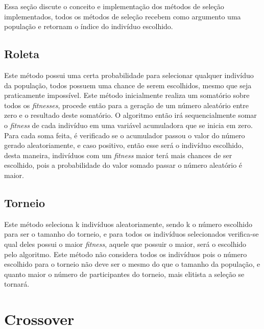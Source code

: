 \documentclass[12pt]{article}
\begin{document}
Essa seção discute o conceito e implementação dos métodos de seleção implementados, todos os métodos de seleção recebem como argumento uma população e 
retornam o índice do indivíduo escolhido.

\subsection{Roleta}

Este método possui uma certa probabilidade para selecionar qualquer indivíduo da população, todos possuem uma chance de serem escolhidos, 
mesmo que seja praticamente impossível. Este método inicialmente realiza um somatório sobre todos os \textit{fitnesses}, procede então para a 
geração de um número aleatório entre zero e o resultado deste somatório. O algoritmo então irá sequencialmente somar o \textit{fitness} de cada 
indivíduo em uma variável acumuladora que se inicia em zero. Para cada soma feita, é verificado se o acumulador passou o valor do número gerado 
aleatoriamente, e caso positivo, então esse será o indivíduo escolhido, desta maneira, indivíduos com um \textit{fitness} maior terá mais chances 
de ser escolhido, pois a probabilidade do valor somado passar o número aleatório é maior.

\subsection{Torneio}

Este método seleciona k indivíduos aleatoriamente, sendo k o número escolhido para ser o tamanho do torneio, e para todos os indivíduos selecionados 
verifica-se qual deles possui o maior \textit{fitness}, aquele que possuir o maior, será o escolhido pelo algoritmo. Este método não considera todos os 
indivíduos pois o número escolhido para o torneio não deve ser o mesmo do que o tamanho da população, e quanto maior o número de participantes do torneio, 
mais elitista a seleção se tornará.

\section{Crossover}
    


\end{document}
